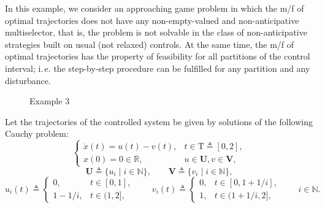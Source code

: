 \documentclass[sn-mathphys,Numbered,pdflatex]{sn-jnl}%
\theoremstyle{thmstyleone}%
\theoremstyle{thmstyletwo}%
\theoremstyle{thmstylethree}%
\newcommand{\beq}{\begin{equation}}
\newcommand{\eeq}{\end{equation}}
\newcommand{\mydef}{\mathrel{\triangleq}}%
\newcommand{\RA}{\ensuremath{\mathbb R}}%
\newcommand{\NA}{\ensuremath{\mathbb N}}%
\newcommand{\naT}{\ensuremath{\mathrm{T}}}%
\newcommand{\UB}{{\mathbf U}}%
\newcommand{\VB}{{\mathbf V}}%
\begin{document}
In this example, we consider an approaching game problem in which the m/f of optimal trajectories does not have any non-empty-valued and non-anticipative multiselector, that is, the problem is not solvable in the class of non-anticipative strategies built on usual (not relaxed) controls.
At the same time, the m/f of optimal trajectories has the property of feasibility for all partitions of the control interval;
i.\,e. the step-by-step procedure can be fulfilled for any partition and any disturbance.

\begin{figure}[!ht]
\begin{center}
\hspace*{-0.5cm}
\end{center}
\caption{Example 3}\label{pic3-ex3}
\end{figure}

Let the trajectories of the controlled system be given by solutions of the following Cauchy problem:
\beq\label{sys5}
\begin{cases}
\dot x(t)=u(t)-v(t),& t\in\naT\mydef[0,2],\\
x(0)=0\in\RA,&u\in\UB, v\in\VB,
\end{cases}
\eeq
\beq\label{UV-def5}
\UB\mydef\{u_i\mid i\in\NA\},\qquad \VB\mydef\{v_i\mid i\in\NA\},
\eeq
\beq\label{UV-def51}
u_i(t)\mydef
\begin{cases}
0,&t\in[0,1],\\
1-1/i,&t\in(1,2],
\end{cases}
\qquad
v_i(t)\mydef
\begin{cases}
0,&t\in[0,1+1/i],\\
1,&t\in(1+1/i,2],
\end{cases}
\qquad i\in\NA.
\eeq
\end{document}
